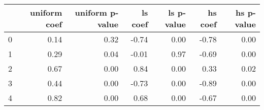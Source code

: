 \begin{tabular}{lrrrrrr}
\toprule
 & uniform coef & uniform p-value & ls coef & ls p-value & hs coef & hs p-value \\
\midrule
0 & 0.14 & 0.32 & -0.74 & 0.00 & -0.78 & 0.00 \\
1 & 0.29 & 0.04 & -0.01 & 0.97 & -0.69 & 0.00 \\
2 & 0.67 & 0.00 & 0.84 & 0.00 & 0.33 & 0.02 \\
3 & 0.44 & 0.00 & -0.73 & 0.00 & -0.89 & 0.00 \\
4 & 0.82 & 0.00 & 0.68 & 0.00 & -0.67 & 0.00 \\
\bottomrule
\end{tabular}
